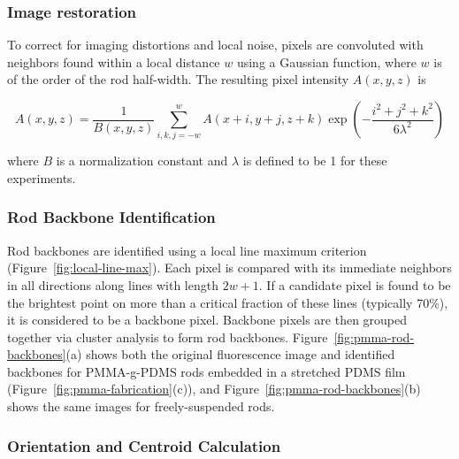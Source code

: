 \subsubsection{Image restoration}

To correct for imaging distortions and local noise, pixels are convoluted with neighbors found within a local
distance $w$ using a Gaussian function, where $w$ is of the order of the rod half-width. The resulting
pixel intensity $A(x,y,z)$ is

\begin{center}
\begin{equation}
A(x,y,z) = \frac{1}{B(x,y,z)} \sum_{i,k,j=-w}^w A(x+i,y+j,z+k) 
\exp{ \left( -\frac{i^2+j^2+k^2}{6\lambda^2} \right)}
\end{equation}
\end{center}

where $B$ is a normalization constant and $\lambda$ is defined to be 1 for these experiments.

\subsubsection{Rod Backbone Identification}

Rod backbones are identified using a local line maximum criterion (Figure~\ref{fig:local-line-max}).  
Each pixel is compared with its immediate 
neighbors in all directions along lines with length $2w+1$.  If a candidate pixel is found to be the brightest
point on more than a critical fraction of these lines (typically 70\%), it is considered to be a backbone
pixel.  Backbone pixels are then grouped together via cluster analysis to form rod backbones.  
Figure~\ref{fig:pmma-rod-backbones}(a)
shows both the original fluorescence image and identified backbones for PMMA-g-PDMS rods
embedded in a stretched PDMS film (Figure~\ref{fig:pmma-fabrication}(c)), and 
Figure~\ref{fig:pmma-rod-backbones}(b) shows the same images for freely-suspended rods.



\subsubsection{Orientation and Centroid Calculation}
\label{sec:orient-calculate}

